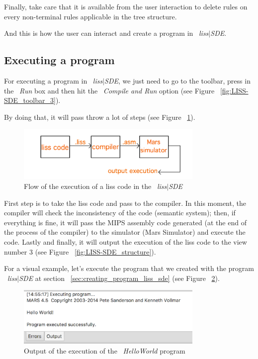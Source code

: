 \documentclass[
  oneside,
  11pt, a4paper,
  footinclude=true,
  headinclude=true,
  cleardoublepage=empty
]{scrbook}
\begin{document}
Finally, take care that it is available from the user interaction to delete rules on every non-terminal rules applicable in the tree structure.

And this is how the user can interact and create a program in ~\textit{liss$|$SDE}.

\newpage

\subsection{Executing a program}

For executing a program in ~\textit{liss$|$SDE}, we just need to go to the toolbar, press in the ~\textit{Run} box and then hit the ~\textit{Compile and Run} option (see Figure ~\ref{fig:LISS-SDE_toolbar_3}).

By doing that, it will pass throw a lot of steps (see Figure ~\ref{fig:flow_execution_program}).

\begin{figure}[h!]
  \centering
    \includegraphics[width=0.8\textwidth]{img/executing_a_program.png}
    \caption{Flow of the execution of a liss code in the ~\textit{liss$|$SDE}}
    \label{fig:flow_execution_program}
\end{figure}

First step is to take the liss code and pass to the compiler. In this moment, the compiler will check the inconsistency of the code (semantic system); then, if everything is fine, it will pass the MIPS assembly code generated (at the end of the process of the compiler) to the simulator (Mars Simulator) and execute the code.
Lastly and finally, it will output the execution of the liss code to the view number 3 (see Figure ~\ref{fig:LISS-SDE_structure}).

For a visual example, let's execute the program that we created with the program ~\textit{liss$|$SDE} at section ~\ref{sec:creating_program_liss_sde} (see Figure ~\ref{fig:helloWorld_execution_liss_sde}).

\begin{figure}[h!]
  \centering
    \includegraphics[width=0.8\textwidth]{img/execution_of_the_program_liss_sde_hello_world.png}
    \caption{Output of the execution of the ~\textit{HelloWorld} program}
    \label{fig:helloWorld_execution_liss_sde}
\end{figure}
\end{document}
